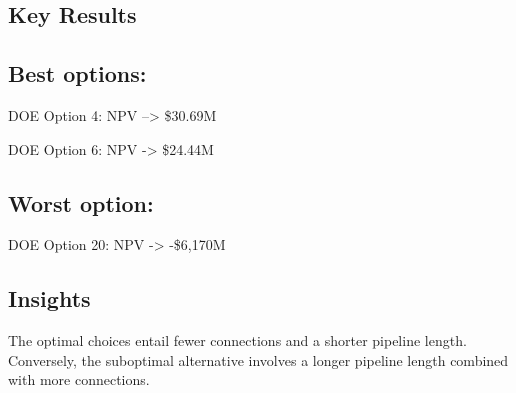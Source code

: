 \documentclass[balance,upint,subscriptcorrection,varvw,mathalfa=cal=boondoxo,spanish,french,vietnamese,russian,greek,pdf-a,colorlinks]{asmeconf}
\begin{document}
\subsection{Key Results}
\subsection*{Best options:}
DOE Option 4: NPV –> \$30.69M

DOE Option 6: NPV -> \$24.44M

\subsection*{Worst option:}
DOE Option 20: NPV -> -\$6,170M

\subsection{Insights}
The optimal choices entail fewer connections and a shorter pipeline length. Conversely, the suboptimal alternative involves a longer pipeline length combined with more connections.

\begin{table}[t]
\caption[Table]{Bounds}\label{bounds:1}
\end{table}

\end{document}
